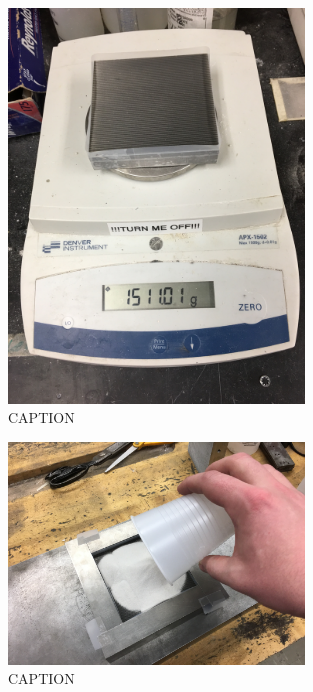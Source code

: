 \clearpage

\begin{figure}
	\centering
        \includegraphics[width=0.7\textwidth]{appendix_sample_prep/dds_block_weight.jpg}
   	\caption{CAPTION}
  	\label{Fig:dds_block_weight}
\end{figure}

\begin{figure}
	\centering
        \includegraphics[width=0.7\textwidth]{appendix_sample_prep/dds_pour_material.jpg}
   	\caption{CAPTION}
  	\label{Fig:dds_pour_material}
\end{figure}

